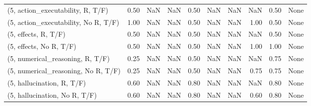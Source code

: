 \begin{table*}[h!]
\begin{adjustbox}{width=2\columnwidth,center}
\begin{tabular}{lrrr|rrr|rrr}
(5, action\_executability, R, T/F)    &                      0.50 &                   NaN &                       NaN &                          0.50 &                       NaN &                           NaN &                                    NaN &                               0.50 &                                  None \\
(5, action\_executability, No R, T/F) &                      1.00 &                   NaN &                       NaN &                          0.50 &                       NaN &                           NaN &                                   1.00 &                               0.50 &                                  None \\
(5, effects, R, T/F)                 &                      0.50 &                   NaN &                       NaN &                          0.50 &                       NaN &                           NaN &                                    NaN &                               0.50 &                                  None \\
(5, effects, No R, T/F)              &                      0.50 &                   NaN &                       NaN &                          0.50 &                       NaN &                           NaN &                                   1.00 &                               1.00 &                                  None \\
(5, numerical\_reasoning, R, T/F)     &                      0.25 &                   NaN &                       NaN &                          0.50 &                       NaN &                           NaN &                                    NaN &                               0.75 &                                  None \\
(5, numerical\_reasoning, No R, T/F)  &                      0.25 &                   NaN &                       NaN &                          0.50 &                       NaN &                           NaN &                                   0.75 &                               0.75 &                                  None \\
(5, hallucination, R, T/F)           &                      0.60 &                   NaN &                       NaN &                          0.80 &                       NaN &                           NaN &                                    NaN &                               0.80 &                                  None \\
(5, hallucination, No R, T/F)        &                      0.60 &                   NaN &                       NaN &                          0.80 &                       NaN &                           NaN &                                   0.60 &                               0.80 &                                  None \\

\end{tabular}
\end{adjustbox}
\end{table*}
